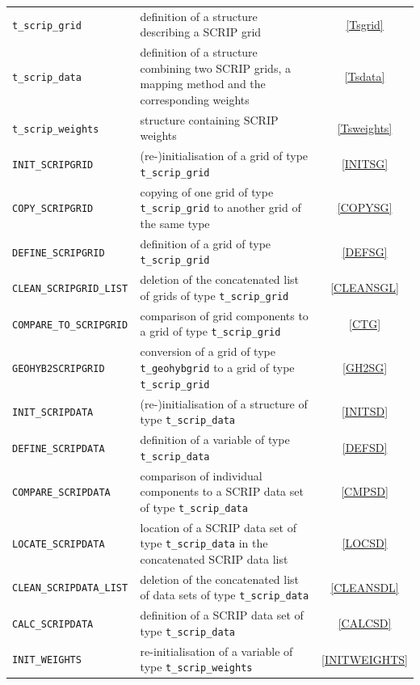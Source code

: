 \documentclass[11pt,twoside]{article}
\begin{document}
\begin{longtable}{|p{5cm}p{8.5cm}c|}
\color{red} \tt t\_scrip\_grid & definition of a structure describing a SCRIP grid & \ref{Tsgrid}\\
\color{red} \tt t\_scrip\_data & definition of a structure combining
two SCRIP grids, a mapping method and the corresponding weights & \ref{Tsdata}\\
\color{red} \tt t\_scrip\_weights & structure containing SCRIP weights & \ref{Tsweights}\\
\color{blue} \tt {INIT\_SCRIPGRID} &  (re-)initialisation of a grid of
type \verb|t_scrip_grid|& \ref{INITSG}\\ 
\color{blue} \tt {COPY\_SCRIPGRID} & copying of one  grid of
type \verb|t_scrip_grid| to another grid of the same type & \ref{COPYSG}\\ 
\color{blue} \tt {DEFINE\_SCRIPGRID} & definition of a grid of
type \verb|t_scrip_grid| & \ref{DEFSG}\\ 
\color{blue} \tt {CLEAN\_SCRIPGRID\_LIST} & deletion of the  concatenated list
of grids of type \verb|t_scrip_grid| & \ref{CLEANSGL}\\ 
\color{blue} \tt {COMPARE\_TO\_SCRIPGRID} & comparison of grid components
to a grid of type  \verb|t_scrip_grid| & \ref{CTG}\\ 
\color{blue} \tt {GEOHYB2SCRIPGRID} & conversion of a grid of
type \verb|t_geohybgrid| to a grid of type \verb|t_scrip_grid| & \ref{GH2SG}\\ 
\color{blue} \tt {INIT\_SCRIPDATA} &  (re-)initialisation of a
structure of type \verb|t_scrip_data|& \ref{INITSD}\\ 
\color{blue} \tt {DEFINE\_SCRIPDATA} & definition of a variable of
type \verb|t_scrip_data|& \ref{DEFSD}\\  
\color{blue} \tt {COMPARE\_SCRIPDATA} & comparison of individual
components to a SCRIP data set of type \verb|t_scrip_data|& \ref{CMPSD}\\  
\color{blue} \tt {LOCATE\_SCRIPDATA} & location of a SCRIP data set of
type \verb|t_scrip_data| in the concatenated SCRIP data list& \ref{LOCSD}\\  
\color{blue} \tt {CLEAN\_SCRIPDATA\_LIST} & deletion of the concatenated list
of data sets of type \verb|t_scrip_data| & \ref{CLEANSDL}\\ 
\color{blue} \tt {CALC\_SCRIPDATA} & definition of a SCRIP data set of type \verb|t_scrip_data|& \ref{CALCSD}\\  
\color{blue} \tt {INIT\_WEIGHTS} & re-initialisation of a variable of
type \verb|t_scrip_weights|& \ref{INITWEIGHTS}\\  

\end{longtable}
\end{document}
